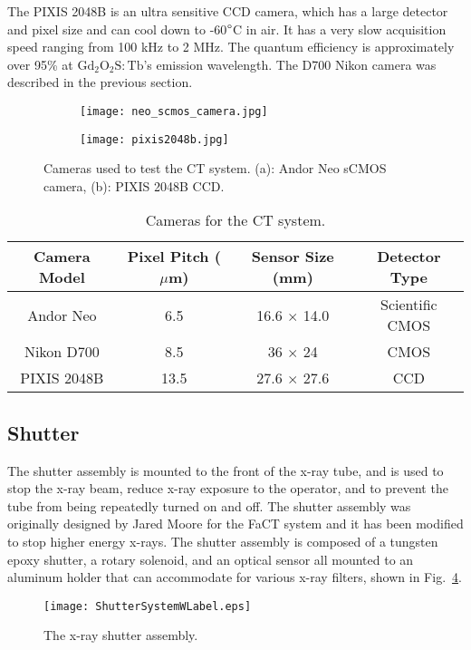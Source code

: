 The PIXIS 2048B is an ultra sensitive CCD camera, which has a large detector and pixel size and can cool down to -60$\degree$C in air.  It has a very slow acquisition speed ranging from 100 kHz to 2 MHz.  The quantum efficiency is approximately over 95\% at $\mathrm{Gd_2O_2S:Tb}$'s emission wavelength. The D700 Nikon camera was described in the previous section.
%
\begin{figure}
	\begin{subfigure}[b]{0.45\linewidth}
	\centering
	\texttt{[image: neo\_scmos\_camera.jpg]}
	\caption{}
	\label{fig:neo}
	\end{subfigure}
\hspace{1 cm}	
	\begin{subfigure}[b]{0.45\linewidth}
	\centering
	\texttt{[image: pixis2048b.jpg]}
	\caption{}
	\label{fig:pixis}
	\end{subfigure}
\caption{Cameras used to test the CT system. (a): Andor Neo sCMOS camera, (b): PIXIS 2048B CCD.}
\label{fig:cameras}
\end{figure}

\begin{table}[h]
\begin{tabular}{c|c|c|c}
\hline
Camera Model & Pixel Pitch ($\mu$m) & Sensor Size (mm) & Detector Type \\ \hline
Andor Neo & 6.5 & 16.6 $\times$ 14.0 & Scientific CMOS \\ \hline
Nikon D700 & 8.5 & 36 $\times$ 24 & CMOS \\ \hline
PIXIS 2048B & 13.5 & 27.6 $\times$ 27.6 & CCD \\
\hline
\end{tabular}
\caption{Cameras for the CT system.}
\label{table:cameras}
\end{table}

\subsection{Shutter}
The shutter assembly is mounted to the front of the x-ray tube, and is used to stop the x-ray beam, reduce x-ray exposure to the operator, and to prevent the tube from being repeatedly turned on and off.  The shutter assembly was originally designed by Jared Moore for the FaCT system and it has been modified to stop higher energy x-rays.  The shutter assembly is composed of a tungsten epoxy shutter, a rotary solenoid, and an optical sensor all mounted to an aluminum holder that can accommodate for various x-ray filters, shown in Fig.~\ref{fig:shutter}.
%
\begin{figure}[h]
\centering
	\texttt{[image: ShutterSystemWLabel.eps]}
	\caption{The x-ray shutter assembly.}
	\label{fig:shutter}
\end{figure}

